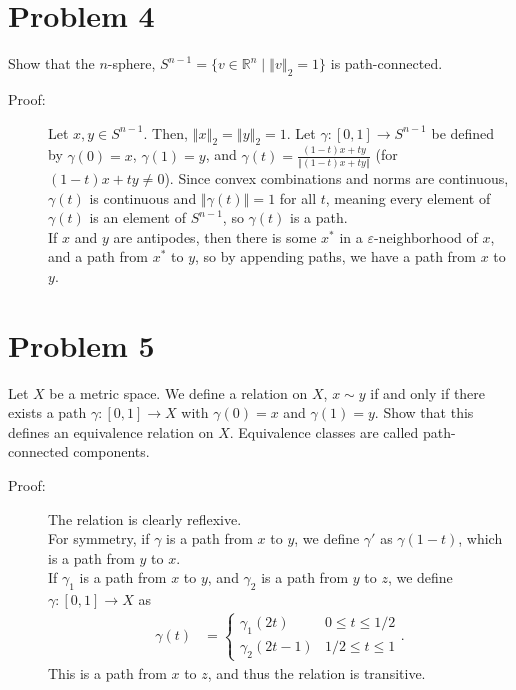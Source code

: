 \documentclass[8pt]{extarticle}
\newcommand{\R}{\mathbb{R}}
\newcommand{\norm}[1]{\left\Vert #1\right\Vert}
\begin{document}
  \section{Problem 4}%
  Show that the $n$-sphere, $S^{n-1} = \{v\in \R^n\mid \norm{v}_2 = 1\}$ is path-connected.
  \begin{description}
    \item[Proof:] Let $x,y\in S^{n-1}$. Then, $\norm{x}_{2} = \norm{y}_{2} = 1$. Let $\gamma: [0,1]\rightarrow S^{n-1}$ be defined by $\gamma(0) = x$, $\gamma(1) = y$, and $\gamma(t) = \frac{(1-t)x + ty}{\norm{(1-t)x + ty}}$ (for $(1-t)x + ty \neq 0$). Since convex combinations and norms are continuous, $\gamma(t)$ is continuous and $\norm{\gamma(t)} = 1$ for all $t$, meaning every element of $\gamma(t)$ is an element of $S^{n-1}$, so $\gamma(t)$ is a path.\\

      If $x$ and $y$ are antipodes, then there is some $x^{\ast}$ in a $\varepsilon$-neighborhood of $x$, and a path from $x^{\ast}$ to $y$, so by appending paths, we have a path from $x$ to $y$.
  \end{description}
  \section{Problem 5}%
  Let $X$ be a metric space. We define a relation on $X$, $x\sim y$ if and only if there exists a path $\gamma: [0,1] \rightarrow X$ with $\gamma(0) = x$ and $\gamma(1) = y$. Show that this defines an equivalence relation on $X$. Equivalence classes are called path-connected components.
  \begin{description}
    \item[Proof:] The relation is clearly reflexive.\\

      For symmetry, if $\gamma$ is a path from $x$ to $y$, we define $\gamma'$ as $\gamma(1-t)$, which is a path from $y$ to $x$.\\

      If $\gamma_1$ is a path from $x$ to $y$, and $\gamma_2$ is a path from $y$ to $z$, we define $\gamma: [0,1]\rightarrow X$ as
      \begin{align*}
        \gamma(t) &= \begin{cases}
          \gamma_1(2t) & 0 \leq t \leq 1/2\\
          \gamma_2(2t - 1) & 1/2 \leq t \leq 1
        \end{cases}.
      \end{align*}
      This is a path from $x$ to $z$, and thus the relation is transitive.
  \end{description}
\end{document}
